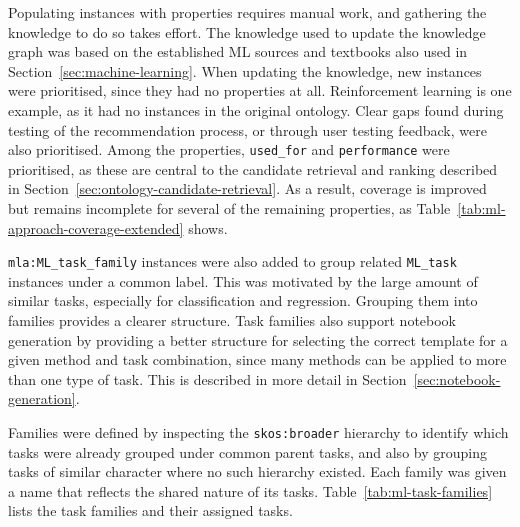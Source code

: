 Populating instances with properties requires manual work, and gathering 
the knowledge to do so takes effort. 
The knowledge used to update the knowledge graph
was based on the established ML sources and textbooks also used in 
Section~\ref{sec:machine-learning}. When updating the knowledge, new instances were prioritised, since 
they had no properties at all. Reinforcement learning is one 
example, as it had no instances in the original ontology. Clear 
gaps found during testing of the recommendation process, or 
through user testing feedback, were also prioritised. Among the properties, \texttt{used\_for} and 
\texttt{performance} were prioritised, as these are central to the 
candidate retrieval and ranking described in 
Section~\ref{sec:ontology-candidate-retrieval}. As a result, 
coverage is improved but remains incomplete for several of the remaining 
properties, as Table~\ref{tab:ml-approach-coverage-extended} shows.

\texttt{mla:ML\_task\_family} instances were also added to group related 
\texttt{ML\_task} instances under a common label. This was motivated by
the large amount of similar tasks, especially for classification and regression. 
Grouping them into families provides 
a clearer structure. Task families also support notebook 
generation by providing a better structure for selecting the correct 
template for a given method and task combination, since many methods 
can be applied to more than one type of task. This is described in 
more detail in Section~\ref{sec:notebook-generation}.

Families were defined by inspecting the \texttt{skos:broader} 
hierarchy to identify which tasks were already grouped under common 
parent tasks, and also by grouping tasks of similar character where no 
such hierarchy existed. Each family was given a name that reflects 
the shared nature of its tasks.
Table~\ref{tab:ml-task-families} lists the task families and their 
assigned tasks.


